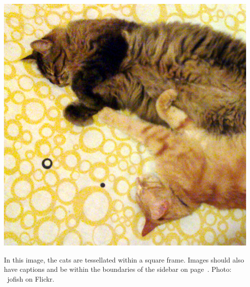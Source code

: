 \documentclass{sigchi-ext}
\begin{document}

\begin{marginfigure}[-35pc]
  \begin{minipage}{\marginparwidth}
    \centering
    \includegraphics[width=0.9\marginparwidth]{figures/cats}
    \caption{In this image, the cats are tessellated within a square
      frame. Images should also have captions and be within the
      boundaries of the sidebar on page~\pageref{sec:sidebar}. Photo:
      \cczero~jofish on Flickr.}~\label{fig:marginfig}
  \end{minipage}
\end{marginfigure}




\balance{} 



\end{document}
